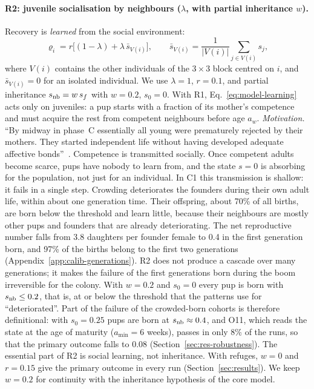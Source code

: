 \paragraph{R2: juvenile socialisation by neighbours ($\lambda$, with partial inheritance $w$).}
Recovery is \emph{learned} from the social environment:
\begin{equation}
  \varrho_i=r\bigl[(1-\lambda)+\lambda\,\bar s_{V(i)}\bigr],\qquad
  \bar s_{V(i)}=\frac{1}{|V(i)|}\sum_{j\in V(i)}s_j ,
  \label{eq:model-learning}
\end{equation}
where $V(i)$ contains the other individuals of the $3\times3$ block centred on $i$, and
$\bar s_{V(i)}=0$ for an isolated individual. We use $\lambda=1$, $r=0.1$, and partial inheritance
$s_{\rm nb}=w\,s_f$ with $w=0.2$, $s_0=0$. With R1, Eq.~\eqref{eq:model-learning} acts only on juveniles:
a pup starts with a fraction of its mother's competence and must acquire the rest from competent
neighbours before age $a_w$.
\emph{Motivation.} ``By midway in phase~C essentially all young were prematurely rejected by their
mothers. They started independent life without having developed adequate affective
bonds''~\cite{Calhoun1973}. Competence is transmitted socially. Once competent adults become scarce,
pups have nobody to learn from, and the state $s=0$ is absorbing for the population, not just for an
individual. In \textsf{C1} this transmission is shallow: it fails in a single step. Crowding deteriorates the
founders during their own adult life, within about one generation time. Their offspring, about 70\% of all births,
are born below the threshold and learn little, because their neighbours are mostly other pups and founders that are
already deteriorating. The net reproductive number falls from 3.8 daughters per founder female to 0.4 in the first
generation born, and 97\% of the births belong to the first two generations (Appendix~\ref{app:calib-generations}). R2 does not
produce a cascade over many generations; it makes the failure of the first generations born during the boom
irreversible for the colony.
With $w=0.2$ and $s_0=0$ every pup is born with $s_{\rm nb}\le0.2$, that is, at or below the threshold that the
patterns use for ``deteriorated''. Part of the failure of the crowded-born cohorts is therefore definitional: with
$s_0=0.25$ pups are born at $s_{\rm nb}\approx0.4$, and O11, which reads the state at the age of maturity
($a_{\min}=6$ weeks), passes in only 8\% of the runs, so that the primary outcome falls to 0.08
(Section~\ref{sec:res-robustness}). The essential part of R2 is social
learning, not inheritance. With refuges, $w=0$ and $r=0.15$ give the primary outcome in every run
(Section~\ref{sec:results}). We keep $w=0.2$ for continuity with the inheritance hypothesis of the core model.

